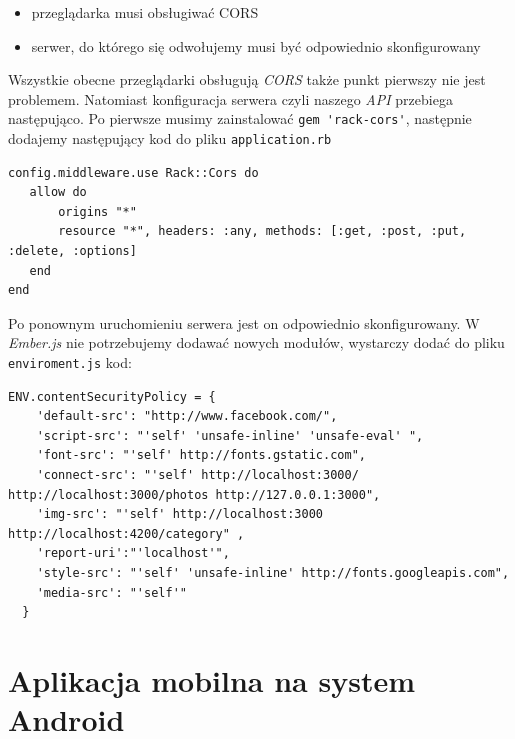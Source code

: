 \documentclass[openright]{xmgr}
\begin{document}
\begin{itemize}
\item przeglądarka musi obsługiwać CORS
\item serwer, do którego się odwołujemy musi być odpowiednio skonfigurowany
\end{itemize}
 Wszystkie obecne przeglądarki obsługują \textit{CORS} także punkt pierwszy nie jest problemem. Natomiast konfiguracja serwera czyli naszego \textit{API} przebiega następująco. Po pierwsze musimy zainstalować \verb|gem 'rack-cors'|, następnie dodajemy następujący kod do pliku \verb|application.rb|
\begin{verbatim}
config.middleware.use Rack::Cors do
   allow do
       origins "*"
       resource "*", headers: :any, methods: [:get, :post, :put, :delete, :options]
   end
end
\end{verbatim}
Po ponownym uruchomieniu serwera jest on odpowiednio skonfigurowany.
\newline\indent W \textit{Ember.js} nie potrzebujemy dodawać nowych modułów, wystarczy dodać do pliku \verb|enviroment.js| kod:
\begin{verbatim}
ENV.contentSecurityPolicy = {
    'default-src': "http://www.facebook.com/",
    'script-src': "'self' 'unsafe-inline' 'unsafe-eval' ",
    'font-src': "'self' http://fonts.gstatic.com", 
    'connect-src': "'self' http://localhost:3000/ http://localhost:3000/photos http://127.0.0.1:3000",
    'img-src': "'self' http://localhost:3000 http://localhost:4200/category" ,
    'report-uri':"'localhost'",
    'style-src': "'self' 'unsafe-inline' http://fonts.googleapis.com", 
    'media-src': "'self'"
  }
\end{verbatim}
\section{Aplikacja mobilna  na system Android}
\end{document}
